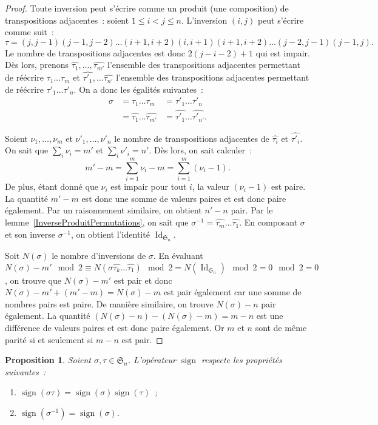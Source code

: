 \documentclass{article}
\DeclareMathOperator{\Id}{Id}
\DeclareMathOperator{\sign}{sign}
\newcommand{\Perm}{\mathfrak{S}}
\newtheorem{prp}[thm]{Proposition}
\theoremstyle{definition}
\theoremstyle{remark}
\begin{document}
		\begin{proof} Toute inversion peut s'écrire comme un produit (une composition) de transpositions adjacentes~: soient $1 \leq i < j \leq n$. L'inversion $(i, j)$
		peut s'écrire comme suit~: \[\tau = (j, j-1)(j-1, j-2)\ldots(i+1, i+2)(i, i+1)(i+1, i+2)\ldots(j-2, j-1)(j-1, j).\]
		Le nombre de transpositions adjacentes est donc $2(j-i-2) + 1$ qui est impair. Dès lors, prenons $\hat{\tau_1}, \dotsc, \hat{\tau_{m'}}$ l'ensemble des
		transpositions adjacentes permettant de réécrire $\tau_1\ldots\tau_m$ et $\hat{\tau'_1}, \ldots \hat{\tau_{n'}}$ l'ensemble des transpositions adjacentes
		permettant de réécrire $\tau'_1\ldots\tau'_n$. On a donc les égalités suivantes~:
		\[\begin{aligned}
			\sigma &= \tau_1\ldots\tau_m &= \tau'_1\ldots\tau'_n \\
			       &= \hat{\tau_1}\ldots\hat{\tau_{m'}} &= \hat{\tau'_1}\ldots\hat{\tau'_{n'}}.
		\end{aligned}\]

		Soient $\nu_1, \dotsc, \nu_m$ et $\nu'_1, \dotsc, \nu'_n$ le nombre de transpositions adjacentes de $\hat{\tau_i}$ et $\hat{\tau'_i}$. On sait que
		$\sum_i\nu_i = m'$ et $\sum_i\nu'_i = n'$. Dès lors, on sait calculer~:
		\[m'-m = \sum_{i=1}^m\nu_i - m = \sum_{i=1}^m(\nu_i-1).\]
		De plus, étant donné que $\nu_i$ est impair pour tout $i$, la valeur $(\nu_i-1)$ est paire. La quantité $m'-m$ est donc une somme de valeurs paires et est
		donc paire également. Par un raisonnement similaire, on obtient $n'-n$ pair. Par le lemme~\ref{InverseProduitPermutations}, on sait que
		$\sigma^{-1} = \hat{\tau_m}\ldots\hat{\tau_1}$. En composant $\sigma$ et son inverse $\sigma^{-1}$, on obtient l'identité $\Id_{\Perm_n}$.

		Soit $N(\sigma)$ le nombre d'inversions de $\sigma$. En évaluant
		$N(\sigma) - m' \mod 2 \equiv N(\sigma\hat{\tau_k}\ldots\hat{\tau_1}) \mod 2 = N(\Id_{\Perm_n}) \mod 2 = 0 \mod 2 = 0$,
		on trouve que $N(\sigma) - m'$ est pair et donc $N(\sigma) - m' + (m' - m) = N(\sigma) - m$ est pair également car une somme de nombres pairs est paire.
		De manière similaire, on trouve $N(\sigma) - n$ pair également. La quantité $\left(N(\sigma) - n\right) - \left(N(\sigma) - m\right) = m - n$ est une
		différence de valeurs paires et est donc paire également. Or $m$ et $n$ sont de même parité si et seulement si $m - n$ est pair. \end{proof}

		\begin{prp}\label{PropsSign} Soient $\sigma, \tau \in \Perm_n$. L'opérateur $\sign$ respecte les propriétés suivantes~:

		\begin{enumerate}
			\item $\sign(\sigma\tau) = \sign(\sigma)\sign(\tau)$~;
			\item $\sign(\sigma^{-1}) = \sign(\sigma)$.
		\end{enumerate}
		\end{prp}
\end{document}
